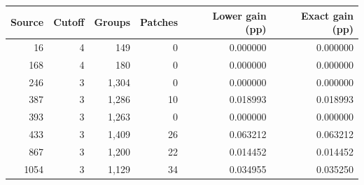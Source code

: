 \begin{tabular}{rrrrrr}
\toprule
Source & Cutoff & Groups & Patches & Lower gain (pp) & Exact gain (pp) \\
\midrule
16 & 4 & 149 & 0 & 0.000000 & 0.000000 \\
168 & 4 & 180 & 0 & 0.000000 & 0.000000 \\
246 & 3 & 1,304 & 0 & 0.000000 & 0.000000 \\
387 & 3 & 1,286 & 10 & 0.018993 & 0.018993 \\
393 & 3 & 1,263 & 0 & 0.000000 & 0.000000 \\
433 & 3 & 1,409 & 26 & 0.063212 & 0.063212 \\
867 & 3 & 1,200 & 22 & 0.014452 & 0.014452 \\
1054 & 3 & 1,129 & 34 & 0.034955 & 0.035250 \\
\bottomrule
\end{tabular}
